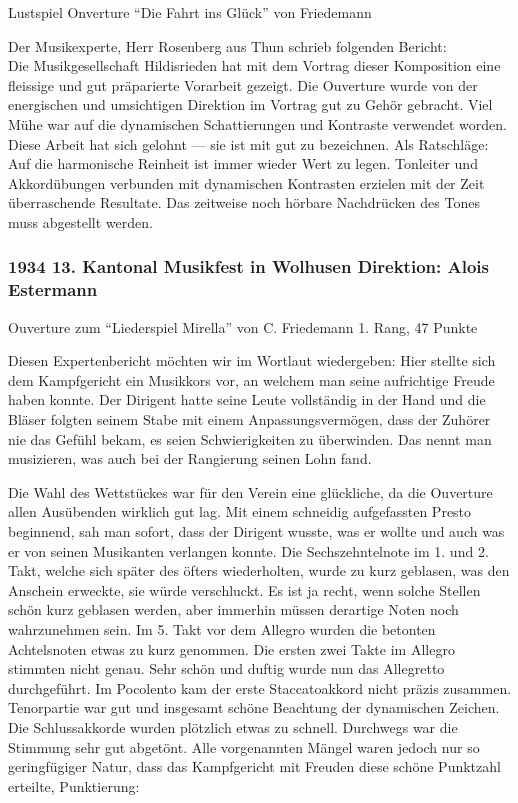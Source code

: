\begin{history}
    Lustspiel Onverture \enquote{Die Fahrt ins Glück} von Friedemann

    Der Musikexperte, Herr Rosenberg aus Thun schrieb folgenden Bericht:\\
    Die Musikgesellschaft Hildisrieden hat mit dem Vortrag dieser Komposition
    eine fleissige und gut präparierte Vorarbeit gezeigt. Die Ouverture wurde
    von der energischen und umsichtigen Direktion im Vortrag gut zu Gehör
    gebracht. Viel Mühe war auf die dynamischen Schattierungen und Kontraste
    verwendet worden. Diese Arbeit hat sich gelohnt — sie ist mit gut zu
    bezeichnen. Als Ratschläge: Auf die harmonische Reinheit ist immer wieder
    Wert zu legen. Tonleiter und Akkordübungen verbunden mit dynamischen
    Kontrasten erzielen mit der Zeit überraschende Resultate. Das zeitweise noch
    hörbare Nachdrücken des Tones muss abgestellt werden.


    \subsubsection{1934 13. Kantonal Musikfest in Wolhusen Direktion: Alois Estermann}


    Ouverture zum \enquote{Liederspiel Mirella} von C. Friedemann 1. Rang, 47
    Punkte

    Diesen Expertenbericht möchten wir im Wortlaut wiedergeben: Hier stellte
    sich dem Kampfgericht ein Musikkors vor, an welchem man seine aufrichtige
    Freude haben konnte. Der Dirigent hatte seine Leute vollständig in der Hand
    und die Bläser folgten seinem Stabe mit einem Anpassungsvermögen, dass der
    Zuhörer nie das Gefühl bekam, es seien Schwierigkeiten zu überwinden. Das
    nennt man musizieren, was auch bei der Rangierung seinen Lohn fand.

    Die Wahl des Wettstückes war für den Verein eine glückliche, da die
    Ouverture allen Ausübenden wirklich gut lag. Mit einem schneidig
    aufgefassten Presto beginnend, sah man sofort, dass der Dirigent wusste, was
    er wollte und auch was er von seinen Musikanten verlangen konnte. Die
    Sechszehntelnote im 1. und 2. Takt, welche sich später des öfters
    wiederholten, wurde zu kurz geblasen, was den Anschein erweckte, sie würde
    verschluckt. Es ist ja recht, wenn solche Stellen schön kurz geblasen
    werden, aber immerhin müssen derartige Noten noch wahrzunehmen sein. Im 5.
    Takt vor dem Allegro wurden die betonten Achtelsnoten etwas zu kurz
    genommen. Die ersten zwei Takte im Allegro stimmten nicht genau. Sehr schön
    und duftig wurde nun das Allegretto durchgeführt. Im Pocolento kam der erste
    Staccatoakkord nicht präzis zusammen. Tenorpartie war gut und insgesamt
    schöne Beachtung der dynamischen Zeichen. Die Schlussakkorde wurden
    plötzlich etwas zu schnell. Durchwegs war die Stimmung sehr gut abgetönt.
    Alle vorgenannten Mängel waren jedoch nur so geringfügiger Natur, dass das
    Kampfgericht mit Freuden diese schöne Punktzahl erteilte, Punktierung:


\end{history}
